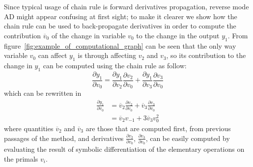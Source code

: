 \clearpage

Since typical usage of chain rule is forward derivatives propagation, reverse mode AD might appear confusing at first sight; to make it clearer we show how the chain rule can be used to back-propagate derivatives in order to compute the contribution $\overline{v}_0$ of the change in variable $v_0$ to the change in the output $y_1$. From figure~\ref{fig:example_of_computational_graph} can be seen that the only way variable $v_0$ can affect $y_1$ is through affecting $v_2$ and $v_3$, so its contribution to the change in $y_1$ can be computed using the chain rule as follow:
\begin{equation}
	\frac{\partial y_1}{\partial v_0} = \frac{\partial y_1}{\partial v_2} \frac{\partial v_2}{\partial v_0} + \frac{\partial y_1}{\partial v_3} \frac{\partial v_3}{\partial v_0}
\end{equation}
which can be rewritten in
\begin{equation}
	\begin{split}
		\frac{\partial y_1}{\partial v_0} & = \overline{v}_2 \frac{\partial v_2}{\partial v_0} + \overline{v}_3 \frac{\partial v_3}{\partial v_0}  \\[2ex]
										  & = \overline{v}_2 v_{-1} + 3 \overline{v}_3 v_0^2
	\end{split}
\end{equation}
where quantities $\overline{v}_2$ and $\overline{v}_3$ are those that are computed first, from previous passages of the method, and derivatives $\frac{\partial v_2}{\partial v_0}$, $\frac{\partial v_3}{\partial v_0}$, can be easily computed by evaluating the result of symbolic differentiation of the elementary operations on the primals $v_i$.


